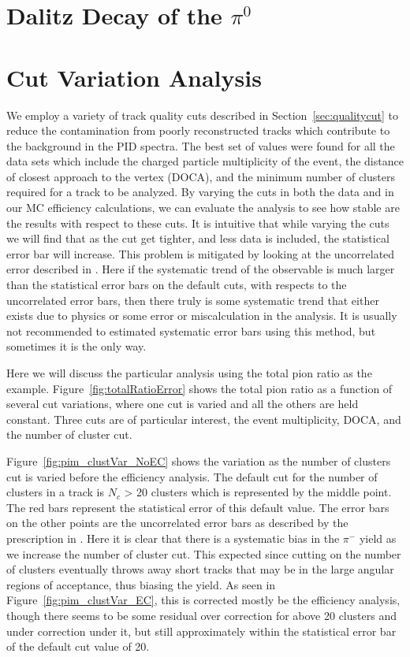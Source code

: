 \clearpage

\section{Dalitz Decay of the $\pi^0$}
\label{appen:dalitz}


\section{Cut Variation Analysis}
\label{sec:cutvar}

We employ a variety of track quality cuts described in Section~\ref{sec:qualitycut} to reduce the contamination from poorly reconstructed tracks which contribute to the background in the PID spectra. The best set of values were found for all the data sets which include the charged particle multiplicity of the event, the distance of closest approach to the vertex (DOCA), and the minimum number of clusters required for a track to be analyzed. By varying the cuts in both the data and in our MC efficiency calculations, we can evaluate the analysis to see how stable are the results with respect to these cuts. It is intuitive that while varying the cuts we will find that as the cut get tighter, and less data is included, the statistical error bar will increase. This problem is mitigated by looking at the uncorrelated error described in \cite{dataAnalysis}. Here if the systematic trend of the observable is much larger than the statistical error bars on the default cuts, with respects to the uncorrelated error bars, then there truly is some systematic trend that either exists due to physics or some error or miscalculation in the analysis. It is usually not recommended to estimated systematic error bars using this method, but sometimes it is the only way. 

Here we will discuss the particular analysis using the total pion ratio as the example. Figure~\ref{fig:totalRatioError} shows the total pion ratio as a function of several cut variations, where one cut is varied and all the others are held constant. Three cuts are of particular interest, the event multiplicity, DOCA, and the number of cluster cut.


 Figure~\ref{fig:pim_clustVar_NoEC} shows the variation as the number of clusters cut is varied before the efficiency analysis. The default cut for the number of clusters in a track is $N_c$ > 20 clusters which is represented by the middle point. The red bars represent the statistical error of this default value. The error bars on the other points are the uncorrelated error bars as described by the prescription in \cite{dataAnalysis}. Here it is clear that there is a systematic bias in the $\pi^-$ yield as we increase the number of cluster cut. This expected since cutting on the number of clusters eventually throws away short tracks that may be in the large angular regions of acceptance, thus biasing the yield. As seen in Figure~\ref{fig:pim_clustVar_EC}, this is corrected mostly be the efficiency analysis, though there seems to be some residual over correction for above 20 clusters and under correction under it, but still approximately within the statistical error bar of the default cut value of 20. 
 
